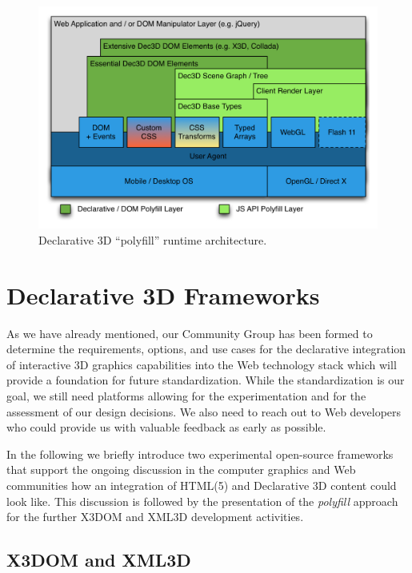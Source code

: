 \documentclass[review]{acmsiggraph}
\begin{document}
\begin{figure}
  \centering
  \includegraphics[width=1.0\columnwidth]{images/Dec3D-Architecture.png}
  \caption{Declarative 3D ``polyfill'' runtime architecture.}
  \label{fig:polyArch}
\end{figure}


\section{Declarative 3D Frameworks}
\label{sec:Frameworks}

As we have already mentioned, our Community Group has been formed to determine the requirements, options, and use cases for the declarative integration of interactive 3D graphics capabilities into the Web technology stack which will provide a foundation for future standardization.
While the standardization is our goal, we still need platforms allowing for the experimentation and for the assessment of our design decisions. We also need to reach out to Web developers who could provide us with valuable feedback as early as possible.

In the following we briefly introduce two experimental open-source frameworks that support the ongoing discussion in the computer graphics and Web communities how an integration of HTML(5) and Declarative 3D content could look like. This discussion is followed by the presentation of the \textit{polyfill} approach for the further X3DOM and XML3D development activities.


\subsection{X3DOM and XML3D}
\end{document}
